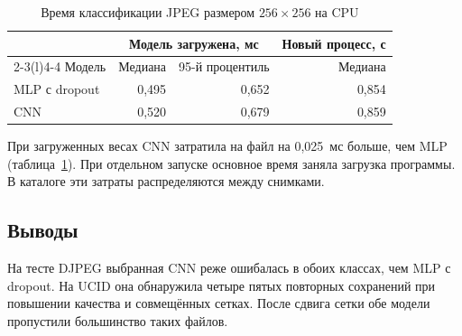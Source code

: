 \begin{table}[htbp]
 \caption{Время классификации JPEG размером $256\times256$ на CPU}
 \label{tab:speed}
 \centering\small\singlespacing
 \begin{tabular}{@{}lrrr@{}}
 \toprule
 & \multicolumn{2}{c}{Модель загружена, мс}
 & \multicolumn{1}{c}{Новый процесс, с} \\
 \cmidrule(lr){2-3}\cmidrule(l){4-4}
 Модель & Медиана & 95-й процентиль & Медиана \\
 \midrule
 MLP с dropout & 0,495 & 0,652 & 0,854 \\
 CNN & 0,520 & 0,679 & 0,859 \\
 \bottomrule
 \end{tabular}
\end{table}

При загруженных весах CNN затратила на файл на 0,025~мс больше, чем MLP (таблица~\ref{tab:speed}). При отдельном запуске основное время заняла загрузка программы. В каталоге эти затраты распределяются между снимками.

\subsection*{Выводы}
На тесте DJPEG выбранная CNN реже ошибалась в обоих классах, чем MLP с dropout. На UCID она обнаружила четыре пятых повторных сохранений при повышении качества и совмещённых сетках. После сдвига сетки обе модели пропустили большинство таких файлов.
